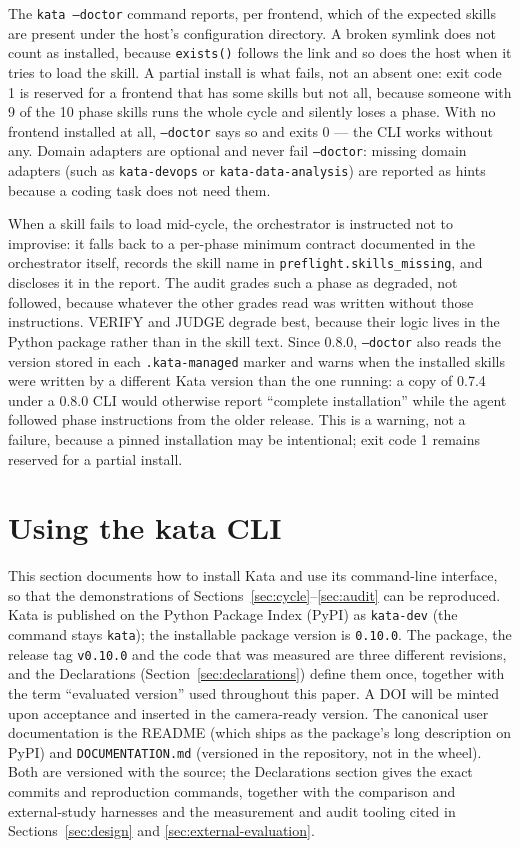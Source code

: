 \documentclass{sbc2019}%
\begin{document}
The \texttt{kata --doctor} command reports, per frontend, which of the
expected skills are present under the host's configuration directory. A
broken symlink does not count as installed, because \texttt{exists()}
follows the link and so does the host when it tries to load the skill. A
partial install is what fails, not an absent one: exit code 1 is reserved
for a frontend that has some skills but not all, because someone with 9 of
the 10 phase skills runs the whole cycle and silently loses a phase. With
no frontend installed at all, \texttt{--doctor} says so and exits 0 --- the
CLI works without any. Domain adapters are optional and never fail
\texttt{--doctor}: missing domain adapters (such as \texttt{kata-devops} or
\texttt{kata-data-analysis}) are reported as hints because a coding task
does not need them.

When a skill fails to load mid-cycle, the orchestrator is instructed not
to improvise: it falls back to a per-phase minimum contract documented in
the orchestrator itself, records the skill name in
\texttt{preflight.skills\_missing}, and discloses it in the report. The
audit grades such a phase as degraded, not followed, because whatever the
other grades read was written without those instructions. VERIFY and JUDGE
degrade best, because their logic lives in the Python package rather than
in the skill text. Since 0.8.0, \texttt{--doctor} also reads the version
stored in each \texttt{.kata-managed} marker and warns when the installed
skills were written by a different Kata version than the one running: a copy
of 0.7.4 under a 0.8.0 CLI would otherwise report ``complete installation''
while the agent followed phase instructions from the older release. This is
a warning, not a failure, because a pinned installation may be intentional;
exit code 1 remains reserved for a partial install.

\section{Using the kata CLI}
\label{sec:usage}

This section documents how to install Kata and use its command-line
interface, so that the demonstrations of
Sections~\ref{sec:cycle}--\ref{sec:audit} can be reproduced. Kata is
published on the Python Package Index (PyPI) as \texttt{kata-dev} (the
command stays \texttt{kata}); the installable package version is
\texttt{0.10.0}. The package, the release tag \texttt{v0.10.0} and the code
that was measured are three different revisions, and the Declarations
(Section~\ref{sec:declarations}) define them once, together with the term
``evaluated version'' used throughout this paper. A DOI will
be minted upon acceptance and inserted in the camera-ready version. The
canonical user documentation is the README (which ships as the package's long
description on PyPI) and \texttt{DOCUMENTATION.md} (versioned in the
repository, not in the wheel). Both are versioned with the source; the
Declarations section gives the exact commits and reproduction commands,
together with the comparison and external-study harnesses and the
measurement and audit tooling cited in Sections~\ref{sec:design} and
\ref{sec:external-evaluation}.
\end{document}
